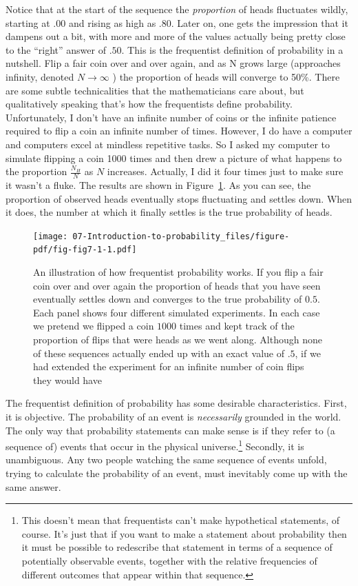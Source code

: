 \documentclass[
  a4paper,
]{book}
\begin{document}
Notice that at the start of the sequence the \emph{proportion} of heads
fluctuates wildly, starting at \(.00\) and rising as high as \(.80\).
Later on, one gets the impression that it dampens out a bit, with more
and more of the values actually being pretty close to the ``right''
answer of \(.50\). This is the frequentist definition of probability in
a nutshell. Flip a fair coin over and over again, and as N grows large
(approaches infinity, denoted \(N \rightarrow \infty\) ) the proportion
of heads will converge to 50\%. There are some subtle technicalities
that the mathematicians care about, but qualitatively speaking that's
how the frequentists define probability. Unfortunately, I don't have an
infinite number of coins or the infinite patience required to flip a
coin an infinite number of times. However, I do have a computer and
computers excel at mindless repetitive tasks. So I asked my computer to
simulate flipping a coin 1000 times and then drew a picture of what
happens to the proportion \(\frac{N_H}{N}\) as \(N\) increases.
Actually, I did it four times just to make sure it wasn't a fluke. The
results are shown in Figure~\ref{fig-fig7-1}. As you can see, the
proportion of observed heads eventually stops fluctuating and settles
down. When it does, the number at which it finally settles is the true
probability of heads.

\begin{figure}

\texttt{[image: 07-Introduction-to-probability\_files/figure-pdf/fig-fig7-1-1.pdf]} \hfill{}

\caption{\label{fig-fig7-1}An illustration of how frequentist
probability works. If you flip a fair coin over and over again the
proportion of heads that you have seen eventually settles down and
converges to the true probability of \(0.5\). Each panel shows four
different simulated experiments. In each case we pretend we flipped a
coin \(1000\) times and kept track of the proportion of flips that were
heads as we went along. Although none of these sequences actually ended
up with an exact value of \(.5\), if we had extended the experiment for
an infinite number of coin flips they would have}

\end{figure}

The frequentist definition of probability has some desirable
characteristics. First, it is objective. The probability of an event is
\emph{necessarily} grounded in the world. The only way that probability
statements can make sense is if they refer to (a sequence of) events
that occur in the physical universe.\footnote{This doesn't mean that
  frequentists can't make hypothetical statements, of course. It's just
  that if you want to make a statement about probability then it must be
  possible to redescribe that statement in terms of a sequence of
  potentially observable events, together with the relative frequencies
  of different outcomes that appear within that sequence.} Secondly, it
is unambiguous. Any two people watching the same sequence of events
unfold, trying to calculate the probability of an event, must inevitably
come up with the same answer.
\end{document}
